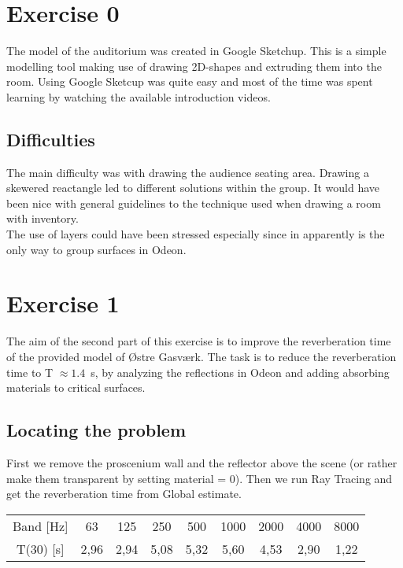 \section{Exercise 0} %
\label{sec:exercise0}
The model of the auditorium was created in Google Sketchup. This is a simple modelling tool making use of drawing 2D-shapes and extruding them into the room. Using Google Sketcup was quite easy and most of the time was spent learning by watching the available introduction videos.\\
\subsection{Difficulties}
The main difficulty was with drawing the audience seating area. Drawing a skewered reactangle led to different solutions within the group. It would have been nice with general guidelines to the technique  used when drawing a room with inventory.\\
The use of layers could have been stressed especially since in apparently is the only way to group surfaces in Odeon. 


\section{Exercise 1} %
\label{sec:exercise1}
The aim of the second part of this exercise is to improve the reverberation time of the provided model of \O stre Gasv\ae rk. The task is to reduce the reverberation time to T $\approx 1.4$~s, by analyzing the reflections in Odeon and adding absorbing materials to critical surfaces.
\subsection{Locating the problem}
First we remove the proscenium wall and the reflector above the scene (or rather make them transparent by setting material = 0). Then we run Ray Tracing and get the reverberation time from Global estimate.

\begin{center}
\begin{tabular}{ccccccccc}
\hline
Band [Hz]   &       63    &   125   &    250    &   500  &    1000   &   2000   &   4000  & 8000 \\
T(30)  [s]   &   2,96   &   2,94  &    5,08   &   5,32   &   5,60  &    4,53  &    2,90  &    1,22 \\
\hline
\end{tabular}
\end{center}

